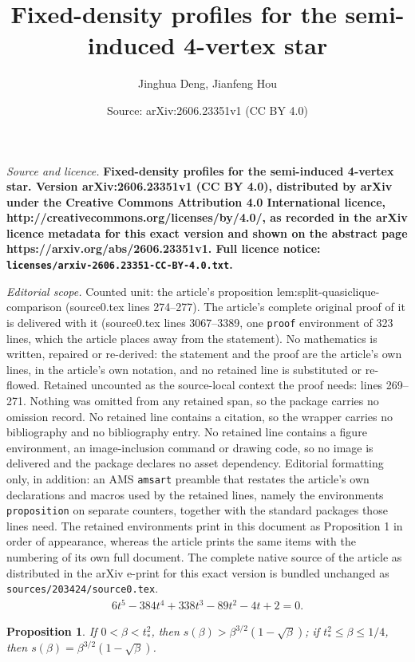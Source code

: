 \documentclass[10pt,a4paper]{amsart}
\title{\bf\Large Fixed-density profiles for the semi-induced 4-vertex star}
\author{Jinghua Deng, Jianfeng Hou}
\date{Source: arXiv:2606.23351v1 (CC BY 4.0)}
\newtheorem{proposition}{Proposition}
\begin{document}
\maketitle

\noindent\emph{Source and licence.} \bf\Large Fixed-density profiles for the semi-induced 4-vertex star. Version arXiv:2606.23351v1 (CC BY 4.0), distributed by arXiv under the Creative Commons Attribution 4.0 International licence, http://creativecommons.org/licenses/by/4.0/, as recorded in the arXiv licence metadata for this exact version and shown on the abstract page https://arxiv.org/abs/2606.23351v1. Full licence notice: \texttt{licenses/arxiv-2606.23351-CC-BY-4.0.txt}.\par\smallskip

\noindent\textit{Editorial scope.} Counted unit: the article's proposition lem:split-quasiclique-comparison (source0.tex lines 274--277). The article's complete original proof of it is delivered with it (source0.tex lines 3067--3389, one \texttt{proof} environment of 323 lines, which the article places away from the statement). No mathematics is written, repaired or re-derived: the statement and the proof are the article's own lines, in the article's own notation, and no retained line is substituted or re-flowed.  Retained uncounted as the source-local context the proof needs: lines 269--271.  Nothing was omitted from any retained span, so the package carries no omission record.  No retained line contains a citation, so the wrapper carries no bibliography and no bibliography entry.  No retained line contains a figure environment, an image-inclusion command or drawing code, so no image is delivered and the package declares no asset dependency.  Editorial formatting only, in addition: an AMS \texttt{amsart} preamble that restates the article's own declarations and macros used by the retained lines, namely the environments \texttt{proposition} on separate counters, together with the standard packages those lines need.  The retained environments print in this document as Proposition 1 in order of appearance, whereas the article prints the same items with the numbering of its own full document.  The complete native source of the article as distributed in the arXiv e-print for this exact version is bundled unchanged as \texttt{sources/203424/source0.tex}.
\begin{align}\label{eq:switching-equation}
        6t^5-384t^4+338t^3-89t^2-4t+2=0.
\end{align}

\begin{proposition}\label{lem:split-quasiclique-comparison}
If $0<\beta<t_*^2$, then $s(\beta)>\beta^{3/2}(1-\sqrt{\beta})$; if $t_*^2\le \beta\le 1/4$, then 
$s(\beta)=\beta^{3/2}(1-\sqrt{\beta})$.
\end{proposition}
\end{document}
